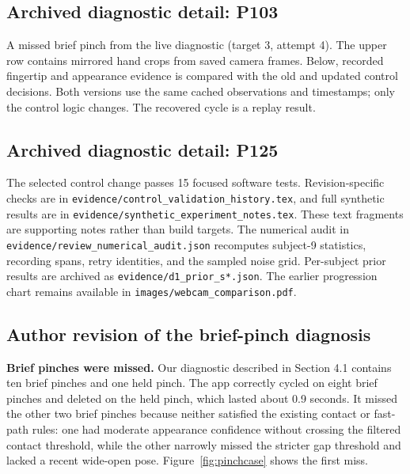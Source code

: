 \subsection*{Archived diagnostic detail: P103}
A missed brief pinch from the live diagnostic (target 3, attempt 4). The upper row contains mirrored hand crops from saved camera frames. Below, recorded fingertip and appearance evidence is compared with the old and updated control decisions. Both versions use the same cached observations and timestamps; only the control logic changes. The recovered cycle is a replay result.

\subsection*{Archived diagnostic detail: P125}
The selected control change passes 15 focused software tests. Revision-specific checks are in \nolinkurl{evidence/control_validation_history.tex}, and full synthetic results are in \nolinkurl{evidence/synthetic_experiment_notes.tex}. These text fragments are supporting notes rather than build targets. The numerical audit in \nolinkurl{evidence/review_numerical_audit.json} recomputes subject-9 statistics, recording spans, retry identities, and the sampled noise grid. Per-subject prior results are archived as \nolinkurl{evidence/d1_prior_s*.json}. The earlier progression chart remains available in \nolinkurl{images/webcam_comparison.pdf}.

\subsection*{Author revision of the brief-pinch diagnosis}
\textbf{Brief pinches were missed.} Our diagnostic described in Section 4.1 contains ten brief pinches and one held pinch. The app correctly cycled on eight brief pinches and deleted on the held pinch, which lasted about 0.9 seconds. It missed the other two brief pinches because neither satisfied the existing contact or fast-path rules: one had moderate appearance confidence without crossing the filtered contact threshold, while the other narrowly missed the stricter gap threshold and lacked a recent wide-open pose. Figure~\ref{fig:pinchcase} shows the first miss.

